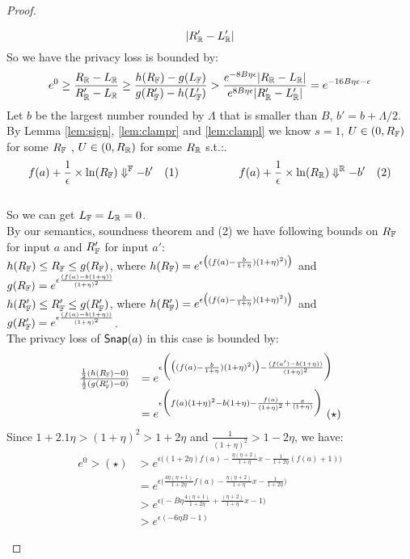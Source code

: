 \documentclass[a4paper,11pt]{article}
\begin{document}
\begin{proof}
\begin{itemize}
\[		|R_{\mathbb{R}}' - L_{\mathbb{R}}'|
		\]
		So we have the privacy loss is bounded by:
		\[
		e^0 
		\geq 
		\frac{R_{\mathbb{R}} - L_{\mathbb{R}}}{R_{\mathbb{R}}' - L_{\mathbb{R}}}
		\geq
		\frac{h(R_{\mathbb{F}}) - g(L_{\mathbb{F}})}
		{g(R_{\mathbb{F}}') - h(L_{\mathbb{F}}')}
		> \frac{e^{-8 B\eta \epsilon}|R_{\mathbb{R}} - L_{\mathbb{R}}|}
		{e^{8 B\eta \epsilon}|R_{\mathbb{R}}' - L_{\mathbb{R}}'|}
		= e^{-16B \eta \epsilon - \epsilon}
		\]
		Let $b$ be the largest number rounded by $\Lambda$ that is smaller than $B$, $b' = b + \Lambda / 2$.
		\\
		By Lemma \ref{lem:sign}, \ref{lem:clampr} and \ref{lem:clampl} we know $s = 1$, 
		$U \in (0, R_{\mathbb{F}})$ for some $R_{\mathbb{F}}$
		, $U \in (0, R_{\mathbb{R}})$ for some $R_{\mathbb{R}}$ s.t.:.
		$$f(a) + \frac{1}{\epsilon} \times \ln(R_{\mathbb{F}}) \Downarrow^{\mathbb{F}} -b' ~~~ (1)
		~~~~~~~~~~~~~~~~
		f(a) + \frac{1}{\epsilon} \times \ln(R_{\mathbb{R}}) \Downarrow^{\mathbb{R}} -b' ~~~ (2)
		$$
		\\
		So we can get $L_{\mathbb{F}} = L_{\mathbb{R}} = 0$.
		\\
		By our semantics, soundness theorem and (2) we have following bounds on $R_{\mathbb{F}}$ for input $a$ and $R_{\mathbb{F}}'$ for input $a'$:
		\\
		$h(R_{\mathbb{F}}) \leq R_{\mathbb{F}} \leq g(R_{\mathbb{F}})$, where
		$h(R_{\mathbb{F}}) = e^{\epsilon 
		\big( (f(a) -  \frac{b}{1 + \eta}) (1 + \eta)^2) \big)}$
		and
		$g(R_{\mathbb{F}}) = e^{\epsilon 
		\frac{(f(a) - b(1 + \eta))}{(1 + \eta)^2}}$
		\\
		$h(R_{\mathbb{F}}') \leq R_{\mathbb{F}}' \leq g(R_{\mathbb{F}}')$, where
		$h(R_{\mathbb{F}}') = e^{\epsilon 
		\big( (f(a) -  \frac{b}{1 + \eta}) (1 + \eta)^2) \big)}$
		and
		$g(R_{\mathbb{F}}') = e^{\epsilon 
		\frac{(f(a) - b(1 + \eta))}{(1 + \eta)^2}}$.
		\\
		The privacy loss of $\mathsf{Snap}(a)$ in this case is bounded by:
		\[
		\begin{array}{ll}
		\frac
		{\frac{1}{2}(h(\fvalR) - 0)}
		{\frac{1}{2}(g(\fvalR') - 0)}
		& = e^{\epsilon
		\bigg(
		\big( (f(a) -  \frac{b}{1 + \eta}) (1 + \eta)^2) \big)
		-
		\frac{(f(a') - b(1 + \eta))}{(1 + \eta)^2}
		\bigg)}\\
		& = e^{\epsilon
		\bigg(
		f(a)(1 + \eta)^2 - b(1 + \eta) 
		- \frac{f(a)}{(1 + \eta)^2} + \frac{x}{(1 + \eta)}   
		\bigg)} ~ (\star)
		\end{array}
		\]
		Since $ 1 + 2.1\eta > (1 + \eta)^2 > 1 + 2\eta$ and $\frac{1}{(1 + \eta)^2} > 1 - 2 \eta$, we have:
		\[
		\begin{array}{ll}
		e^0 > (\star) & > e^{\epsilon \big(
		(1 + 2\eta) f(a) - \frac{\eta(\eta + 2)}{1 + \eta} x
		- \frac{1}{1 + 2\eta}(f(a) + 1)
		\big)}\\
		& = e^{\epsilon\big(
		\frac{4\eta(\eta + 1)}{1 + 2\eta} f(a) 
		- \frac{\eta(\eta + 2)}{1 + \eta} x
		- \frac{1}{1 + 2\eta}		
		\big)}\\
		& > e^{\epsilon\big( -B \eta
		\frac{4(\eta + 1)}{1 + 2\eta} + \frac{(\eta + 2)}{1 + \eta} x - 1	
		\big)}\\
%
		& > e^{\epsilon(-6 \eta B - 1)}
		\end{array}
		\]
	\end{itemize}



\end{proof}
\end{document}
